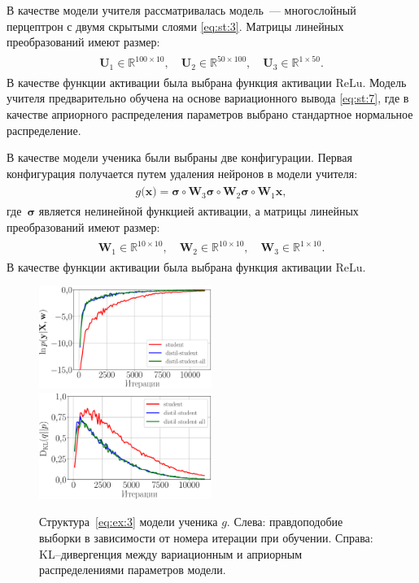 \documentclass[12pt]{a&t}
\begin{document}
В качестве модели учителя рассматривалась модель~--- многослойный перцептрон с двумя скрытыми слоями \eqref{eq:st:3}. Матрицы линейных преобразований имеют размер:
\begin{gather}
\label{eq:ex:2}
\begin{aligned}
\mathbf{U}_{1} \in \mathbb{R}^{100 \times 10}, \quad \mathbf{U}_{2} \in \mathbb{R}^{50 \times 100}, \quad \mathbf{U}_{3} \in \mathbb{R}^{1 \times 50}.
\end{aligned}
\end{gather}
В качестве функции активации была выбрана функция активации $\text{ReLu}$.
Модель учителя предварительно обучена на основе вариационного вывода \eqref{eq:st:7}, где в качестве априорного распределения параметров выбрано стандартное нормальное распределение.

В качестве модели ученика были выбраны две конфигурации. Первая конфигурация получается путем удаления нейронов в модели учителя:
\begin{gather}
\label{eq:ex:3}
\begin{aligned}
g\bigr(\mathbf{x}\bigr) = \bm{\sigma} \circ \mathbf{W}_3\bm{\sigma} \circ \mathbf{W}_2\bm{\sigma} \circ \mathbf{W}_1\mathbf{x},
\end{aligned}
\end{gather}
где~$\bm{\sigma}$ является нелинейной функцией активации, а матрицы линейных преобразований имеют размер:
\begin{gather}
\label{eq:ex:4}
\begin{aligned}
\mathbf{W}_{1} \in \mathbb{R}^{10 \times 10}, \quad \mathbf{W}_{2} \in \mathbb{R}^{10 \times 10},  \quad \mathbf{W}_{3} \in \mathbb{R}^{1 \times 10}.
\end{aligned}
\end{gather}
В качестве функции активации была выбрана функция активации $\text{ReLu}$.

\begin{figure}[h!]
\includegraphics[width=0.5\textwidth]{synthetic_likelihood_3_layers.eps}
\includegraphics[width=0.5\textwidth]{synthetic_D_KL_3_layers.eps}
\caption{Структура~\eqref{eq:ex:3} модели ученика $g$. Слева: правдоподобие выборки в зависимости от номера итерации при обучении. Справа: KL--дивергенция между вариационным и априорным распределениями параметров модели.}
\label{exp:fig1}
\end{figure}
\end{document}
